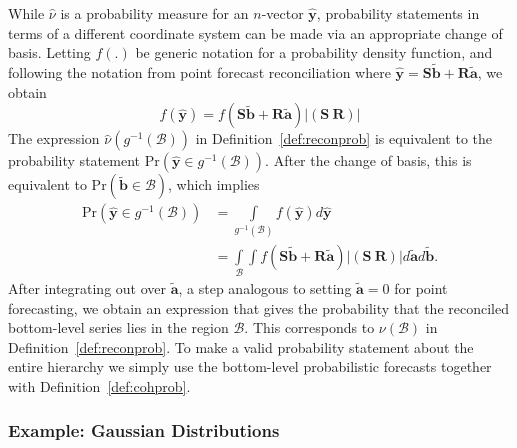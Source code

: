 \documentclass[12pt]{article}
\theoremstyle{definition}
\begin{document}
While $\hat{\nu}$ is a probability measure for an $n$-vector $\hat{\bm{y}}$, probability statements in terms of a different coordinate system can be made via an appropriate change of basis. Letting $f(.)$ be generic notation for a probability density function, and following the notation from point forecast reconciliation where $\hat{\bm{y}}=\bm{S}\tilde{\bm{b}}+\bm{R}\tilde{\bm{a}}$, we obtain
\begin{equation}
f(\hat{\bm{y}})=f(\bm{S}\tilde{\bm{b}}+\bm{R}\tilde{\bm{a}})|(\bm{S}~\bm{R})|
\end{equation}
The expression $\hat{\nu}(g^{-1}(\mathcal{B}))$ in Definition~\ref{def:reconprob} is equivalent to the probability statement $\text{Pr}(\hat{\bm{y}}\in g^{-1}(\mathcal{B}))$. After the change of basis, this is equivalent to $\text{Pr}(\tilde{\bm{b}}\in \mathcal{B})$, which implies
\begin{align}
\text{Pr}(\hat{\bm{y}}\in g^{-1}(\mathcal{B}))&=\int\limits_{g^{-1}(\mathcal{B})}f(\hat{\bm{y}})d\hat{\bm{y}}\\
&=\int\limits_{\mathcal{B}}\int f(\bm{S}\tilde{\bm{b}}
+\bm{R}\tilde{\bm{a}})|(\bm{S}~\bm{R})|d\tilde{\bm{a}}d\tilde{\bm{b}}.
\end{align}
After integrating out over $\tilde{\bm{a}}$, a step analogous to setting $\tilde{\bm{a}}=0$ for point forecasting, we obtain an expression that gives the probability that the reconciled bottom-level series lies in the region $\mathcal{B}$. This corresponds to $\nu(\mathcal{B})$ in Definition~\ref{def:reconprob}. To make a valid probability statement about the entire hierarchy we simply use the bottom-level probabilistic forecasts together with Definition~\ref{def:cohprob}.

\subsubsection*{Example: Gaussian Distributions}
\end{document}
